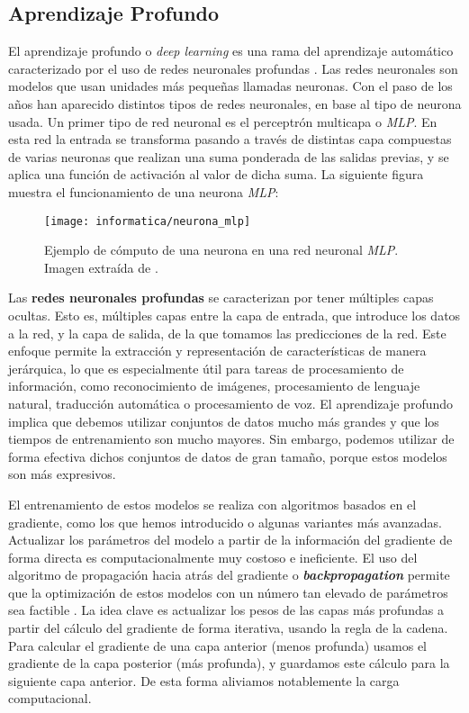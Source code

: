 \subsection{Aprendizaje Profundo} \label{isubs:deep_learning_teoria}

El aprendizaje profundo o \textit{deep learning} es una rama del aprendizaje automático caracterizado por el uso de redes neuronales profundas \cite{informatica:paper_deep_learning_def} \cite{informatica:paper_deep_learning_def_second}. Las redes neuronales son modelos que usan unidades más pequeñas llamadas neuronas. Con el paso de los años han aparecido distintos tipos de redes neuronales, en base al tipo de neurona usada. Un primer tipo de red neuronal es el perceptrón multicapa o \textit{MLP}. En esta red la entrada se transforma pasando a través de distintas capa compuestas de varias neuronas que realizan una suma ponderada de las salidas previas, y se aplica una función de activación al valor de dicha suma. La siguiente figura muestra el funcionamiento de una neurona \textit{MLP}:

\begin{figure}[H]
	\centering
	\texttt{[image: informatica/neurona\_mlp]}
	\caption{Ejemplo de cómputo de una neurona en una red neuronal \textit{MLP}. Imagen extraída de \cite{informatica:paper_deep_learning_def}.}
\end{figure}

Las \textbf{redes neuronales profundas} se caracterizan por tener múltiples capas ocultas. Esto es, múltiples capas entre la capa de entrada, que introduce los datos a la red, y la capa de salida, de la que tomamos las predicciones de la red. Este enfoque permite la extracción y representación de características de manera jerárquica, lo que es especialmente útil para tareas de procesamiento de información, como reconocimiento de imágenes, procesamiento de lenguaje natural, traducción automática o procesamiento de voz. El aprendizaje profundo implica que debemos utilizar conjuntos de datos mucho más grandes y que los tiempos de entrenamiento son mucho mayores. Sin embargo, podemos utilizar de forma efectiva dichos conjuntos de datos de gran tamaño, porque estos modelos son más expresivos.

El entrenamiento de estos modelos se realiza con algoritmos basados en el gradiente, como los que hemos introducido o algunas variantes más avanzadas. Actualizar los parámetros del modelo a partir de la información del gradiente de forma directa es computacionalmente muy costoso e ineficiente. El uso del algoritmo de propagación hacia atrás del gradiente o \textbf{\textit{backpropagation}} permite que la optimización de estos modelos con un número tan elevado de parámetros sea factible \cite{informatica:libro_backprop}. La idea clave es actualizar los pesos de las capas más profundas a partir del cálculo del gradiente de forma iterativa, usando la regla de la cadena. Para calcular el gradiente de una capa anterior (menos profunda) usamos el gradiente de la capa posterior (más profunda), y guardamos este cálculo para la siguiente capa anterior. De esta forma aliviamos notablemente la carga computacional.

